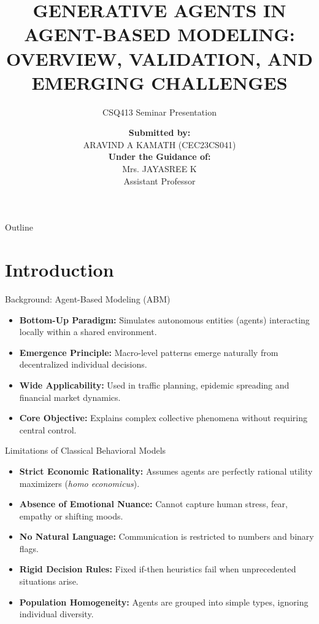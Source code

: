 \documentclass{beamer}
\title[Generative Agents in ABM]{\large \textbf{GENERATIVE AGENTS IN AGENT-BASED MODELING: OVERVIEW, VALIDATION, AND EMERGING CHALLENGES}}
\subtitle{CSQ413 Seminar Presentation}
\author[Aravind A Kamath | CEC23CS041]{
\textbf{Submitted by:} \\ ARAVIND A KAMATH (CEC23CS041) \\[0.25cm]
\textbf{Under the Guidance of:} \\ Mrs. JAYASREE K \\ Assistant Professor
}
\institute[]{
Department of Computer Science and Engineering \\ College of Engineering, Cherthala
}
\date{}
\begin{document}
\begin{frame}
  \titlepage
\end{frame}

\begin{frame}{Outline}
\tableofcontents
\end{frame}

\section{Introduction}

\begin{frame}{Background: Agent-Based Modeling (ABM)}
\begin{itemize}
    \item \textbf{Bottom-Up Paradigm:} Simulates autonomous entities (agents) interacting locally within a shared environment.
    \medskip
    \item \textbf{Emergence Principle:} Macro-level patterns emerge naturally from decentralized individual decisions.
    \medskip
    \item \textbf{Wide Applicability:} Used in traffic planning, epidemic spreading and financial market dynamics.
    \medskip
    \item \textbf{Core Objective:} Explains complex collective phenomena without requiring central control.
\end{itemize}
\end{frame}

\begin{frame}{Limitations of Classical Behavioral Models}
\begin{itemize}
    \item \textbf{Strict Economic Rationality:} Assumes agents are perfectly rational utility maximizers (\textit{homo economicus}).
    \medskip
    \item \textbf{Absence of Emotional Nuance:} Cannot capture human stress, fear, empathy or shifting moods.
    \medskip
    \item \textbf{No Natural Language:} Communication is restricted to numbers and binary flags.
    \medskip
    \item \textbf{Rigid Decision Rules:} Fixed if-then heuristics fail when unprecedented situations arise.
    \medskip
    \item \textbf{Population Homogeneity:} Agents are grouped into simple types, ignoring individual diversity.
\end{itemize}
\end{frame}
\end{document}
